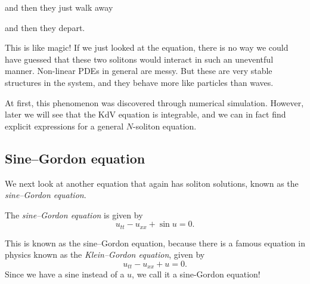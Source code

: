 \documentclass[a4paper]{article}
\begin{document}
\begin{center}
  \centering
\end{center}
and then they just walk away
\begin{center}
  \centering
\end{center}
and then they depart.
\begin{center}
  \centering
\end{center}
This is like magic! If we just looked at the equation, there is no way we could have guessed that these two solitons would interact in such an uneventful manner. Non-linear PDEs in general are messy. But these are very stable structures in the system, and they behave more like particles than waves.

At first, this phenomenon was discovered through numerical simulation. However, later we will see that the KdV equation is integrable, and we can in fact find explicit expressions for a general $N$-soliton equation.

\subsection{Sine--Gordon equation}
We next look at another equation that again has soliton solutions, known as the \emph{sine--Gordon equation}.
\begin{defi}
  The \emph{sine--Gordon equation} is given by
  \[
    u_{tt} - u_{xx} + \sin u = 0.
  \]
\end{defi}
This is known as the sine--Gordon equation, because there is a famous equation in physics known as the \emph{Klein--Gordon equation}, given by
\[
  u_{tt} - u_{xx} + u = 0.
\]
Since we have a sine instead of a $u$, we call it a sine-Gordon equation!
\end{document}
